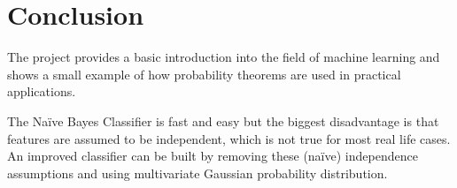 \section{Conclusion}

The project provides a basic introduction into the field of machine learning 
and shows a small example of how probability theorems are used in practical applications.
\par\medskip
The Na\"ive Bayes Classifier is fast and easy but the biggest disadvantage is that features are assumed to be independent, which is not true for most real life cases. An improved classifier can be built by removing these (naïve) independence assumptions and using multivariate Gaussian probability distribution.


\nocite{*}
\printbibliography
